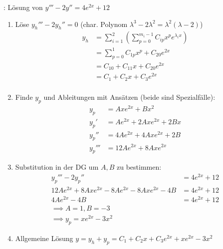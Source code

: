 \Bsp {}: Lösung von $y''' - 2y'' = 4e^{2x} + 12$
\begin{enumerate}
    \item Löse $y_h''' - 2y_h'' = 0$ (char. Polynom $\lambda^3 - 2\lambda^2 = \lambda^2(\lambda - 2)$)
        \vspace{-0.4em}
        \begin{align*}
            y_h &= \sum_{i = 1}^{2} (\sum_{p=0}^{m_i - 1} C_{ip} x^p e^{\lambda_i x}) \\[-0.6em]
                &= \sum_{p = 0}^1 C_{1p} x^p + C_{20} e^{2x} \\[-0.6em]
                &= C_{10} + C_{11}x + C_{20}e^{2x} \\[-0.6em]
                &= C_1 + C_2x + C_3e^{2x} \\[-0.6em]
        \end{align*}
    \item Finde $y_p$ und Ableitungen mit Ansätzen (beide sind Spezialfälle):
        \vspace{-1em}
        \begin{align*}
            y_p &= A x e^{2x} + B x^2 \\[-0.4em]
            y_p' &= A e^{2x} + 2 A x e^{2x} + 2 B x \\[-0.4em]
            y_p'' &= 4Ae^{2x} + 4A x e^{2x} + 2B \\[-0.4em]
            y_p''' &= 12 A e^{2x} + 8A x e^{2x}
        \end{align*}
    \item Substitution in der DG um $A, B$ zu bestimmen:
        \begin{align*}
            y_p''' - 2y_p'' &= 4e^{2x} + 12 \\[-0.3em]
            12A e^{2x} + 8Axe^{2x} - 8Ae^{2x} - 8Axe^{2x} - 4B &= 4e^{2x} + 12 \\[-0.6em]
            4A e^{2x} - 4B &= 4e^{2x} + 12 \\[-0.6em]
            \implies A = 1, B = -3 \hspace{60pt}& \\[-0.6em]
            \implies y_p = x e^{2x} - 3 x^2 \hspace{61pt}&
        \end{align*}
    \item Allgemeine Lösung $y = y_h + y_p = C_1 + C_2x + C_3e^{2x} + x e^{2x} - 3 x^2$
\end{enumerate}

